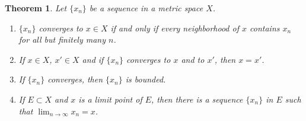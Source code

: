 \documentclass[11pt]{book}
\newtheorem{theorem}{Theorem}[chapter]
\theoremstyle{definition}
\numberwithin{equation}{chapter}
\begin{document}
\begin{theorem}\label{th_21}
Let $\{x_n\}$ be a sequence in a metric space $X$.
\begin{enumerate}[label=(\alph*)]
    \item $\{x_n\}$ converges to $x \in X$ if and only if every neighborhood of $x$ contains $x_n$ for all but finitely many $n$. \label{th_21_a}
    
    \item If $x \in X$, $x' \in X$ and if $\{x_n\}$ converges to $x$ and to $x'$, then $x = x'$. \label{th_21_b}
    
    \item If $\{x_n\}$ converges, then $\{x_n\}$ is bounded. \label{th_21_c}
    
    \item If $E \subset X$ and $x$ is a limit point of $E$, then there is a sequence $\{x_n\}$ in $E$ such that $\lim_{n\to\infty} x_n = x$. \label{th_21_d}
\end{enumerate}
\end{theorem}
\end{document}
